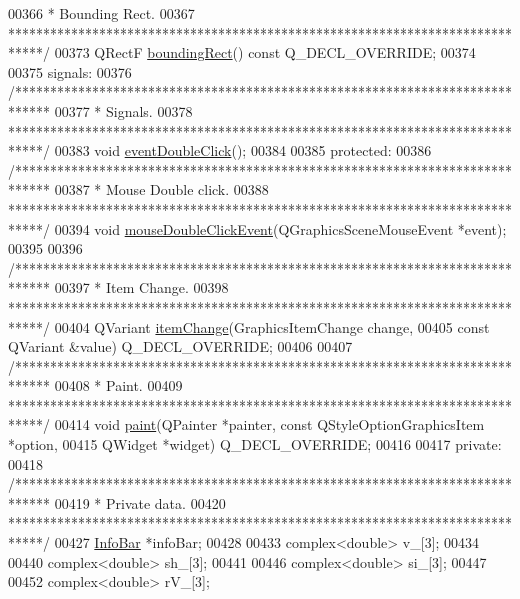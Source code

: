 \begin{DoxyCode}
00366 \textcolor{comment}{  * Bounding Rect.}
00367 \textcolor{comment}{  *****************************************************************************/}
00373   QRectF \hyperlink{group___models_ga8279d8109019cc7e139e2023690496be}{boundingRect}() const Q\_DECL\_OVERRIDE;
00374 
00375 signals:
00376   \textcolor{comment}{/*****************************************************************************}
00377 \textcolor{comment}{  * Signals.}
00378 \textcolor{comment}{  *****************************************************************************/}
00383   \textcolor{keywordtype}{void} \hyperlink{class_bar_a66bcbd19582dddee7e171ae5a4475f4b}{eventDoubleClick}();
00384 
00385 protected:
00386   \textcolor{comment}{/*****************************************************************************}
00387 \textcolor{comment}{  * Mouse Double click.}
00388 \textcolor{comment}{  *****************************************************************************/}
00394   \textcolor{keywordtype}{void} \hyperlink{group___models_ga1945e7b4401fa9ad7475274d9fb12a72}{mouseDoubleClickEvent}(QGraphicsSceneMouseEvent *event);
00395 
00396   \textcolor{comment}{/*****************************************************************************}
00397 \textcolor{comment}{  * Item Change.}
00398 \textcolor{comment}{  *****************************************************************************/}
00404   QVariant \hyperlink{group___models_gad97a82d618ee0c51a9a36e44339c69e6}{itemChange}(GraphicsItemChange change,
00405                       const QVariant &value) Q\_DECL\_OVERRIDE;
00406 
00407   \textcolor{comment}{/*****************************************************************************}
00408 \textcolor{comment}{  * Paint.}
00409 \textcolor{comment}{  *****************************************************************************/}
00414   \textcolor{keywordtype}{void} \hyperlink{group___models_gacbb6dbac607412c9c1f9dfcd0cd4d432}{paint}(QPainter *painter, const QStyleOptionGraphicsItem *option,
00415              QWidget *widget) Q\_DECL\_OVERRIDE;
00416 
00417 private:
00418   \textcolor{comment}{/*****************************************************************************}
00419 \textcolor{comment}{  * Private data.}
00420 \textcolor{comment}{  *****************************************************************************/}
00427   \hyperlink{class_info_bar}{InfoBar} *infoBar;
00428 
00433   complex<\textcolor{keywordtype}{double}> v\_[3];
00434 
00440   complex<\textcolor{keywordtype}{double}> sh\_[3];
00441 
00446   complex<\textcolor{keywordtype}{double}> si\_[3];
00447 
00452   complex<\textcolor{keywordtype}{double}> rV\_[3];

\end{DoxyCode}
